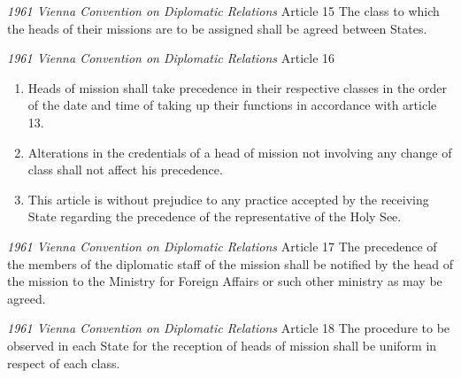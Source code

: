 \begin{conventiondetails}{\textit{1961 Vienna Convention on Diplomatic Relations} Article 15}
    \flushleft
    The class to which the heads of their missions are to be assigned shall be agreed between States.
\end{conventiondetails}

\begin{conventiondetails}{\textit{1961 Vienna Convention on Diplomatic Relations} Article 16}
    \flushleft
    \begin{enumerate}
        \item Heads of mission shall take precedence in their respective classes in the order of the date and time of taking up their functions in accordance with article 13.
        \item Alterations in the credentials of a head of mission not involving any change of class shall not affect his precedence.
        \item This article is without prejudice to any practice accepted by the receiving State regarding the precedence of the representative of the Holy See.
    \end{enumerate}
\end{conventiondetails}

\begin{conventiondetails}{\textit{1961 Vienna Convention on Diplomatic Relations} Article 17}
    \flushleft
    The precedence of the members of the diplomatic staff of the mission shall be notified by the head of the mission to the Ministry for Foreign Affairs or such other ministry as may be agreed.
\end{conventiondetails}

\begin{conventiondetails}{\textit{1961 Vienna Convention on Diplomatic Relations} Article 18}
    \flushleft
    The procedure to be observed in each State for the reception of heads of mission shall be uniform in respect of each class.
\end{conventiondetails}

